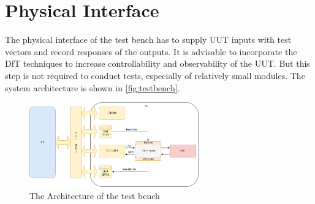 \section{Physical Interface}
The physical interface of the test bench has to supply UUT inputs with test vectors and record responses of the outputs. It is advisable to incorporate the DfT techniques to increase controllability and observability of the UUT. But this step is not required to conduct tests, especially of relatively small modules. The system architecture is shown in \autoref{fig:testbench}.

\begin{figure}[H]
\centering
\includegraphics[width=0.65\textwidth]{figures/TestBench.png}
\caption{The Architecture of the test bench~\cite{book:ZynqBook}}
\label{fig:testbench}
\end{figure}


